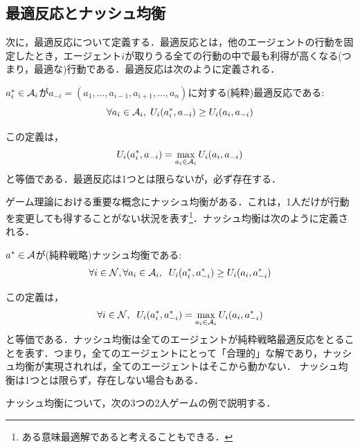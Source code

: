 \documentclass{jsreport}
\begin{document}
\subsection{最適反応とナッシュ均衡}
次に，最適反応について定義する．最適反応とは，他のエージェントの行動を固定したとき，エージェント$i$が取りうる全ての行動の中で最も利得が高くなる(つまり，最適な)行動である．最適反応は次のように定義される．
\begin{screen}
  \begin{defi}[最適反応]
    $a_i^{*} \in {\cal A}_i$が$a_{-i} = (a_1, \ldots, a_{i - 1}, a_{i + 1}, \ldots, a_n)$に対する(純粋)最適反応である:
    \begin{equation}
      \forall a_i \in {\cal A}_i, \; U_i(a_i^{*}, a_{-i}) \geq U_i(a_i, a_{-i}) \nonumber
    \end{equation}
  \end{defi}
\end{screen}
この定義は，
\begin{equation}
  U_i(a_i^{*}, a_{-i}) = \max_{a_i \in {\cal A}_i} U_i(a_i, a_{-i}) \nonumber
\end{equation}
と等価である．最適反応は1つとは限らないが，必ず存在する．

ゲーム理論における重要な概念にナッシュ均衡がある．これは，1人だけが行動を変更しても得することがない状況を表す\footnote{ある意味最適解であると考えることもできる．}．ナッシュ均衡は次のように定義される．
\begin{screen}
  \begin{defi}
    $a^{*} \in {\cal A}$が(純粋戦略)ナッシュ均衡である:
    \begin{equation}
      \forall i \in \mathcal{N}, \forall a_i \in {\cal A}_i, \; \; U_i(a_i^{*}, a_{-i}^{*}) \geq U_i(a_i, a_{-i}^{*}) \nonumber
    \end{equation}
  \end{defi}
\end{screen}
この定義は，
\begin{equation}
  \forall i \in \mathcal{N}, \; \; U_i(a_i^{*}, a_{-i}^{*}) = \max_{a_i \in {\cal A}_i} U_i(a_i, a_{-i}^{*}) \nonumber
\end{equation}
と等価である．ナッシュ均衡は全てのエージェントが純粋戦略最適反応をとることを表す．つまり，全てのエージェントにとって「合理的」な解であり，ナッシュ均衡が実現されれば，全てのエージェントはそこから動かない．
ナッシュ均衡は1つとは限らず，存在しない場合もある．

ナッシュ均衡について，次の3つの2人ゲームの例で説明する．
\end{document}
